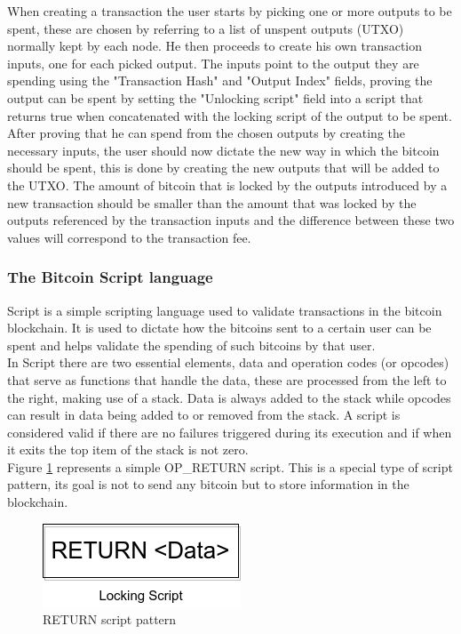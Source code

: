 When creating a transaction the user starts by picking one or more outputs to be spent, these are chosen by referring to a list of unspent outputs (UTXO) normally kept by each node. He then proceeds to create his own transaction inputs, one for each picked output. The inputs point to the output they are spending using the "Transaction Hash" and "Output Index" fields, proving the output can be spent by setting the "Unlocking script" field into a script that returns true when concatenated with the locking script of the output to be spent.
After proving that he can spend from the chosen outputs by creating the necessary inputs, the user should now dictate the new way in which the bitcoin should be spent, this is done by creating the new outputs that will be added to the UTXO. The amount of bitcoin that is locked by the outputs introduced by a new transaction should be smaller than the amount that was locked by the outputs referenced by the transaction inputs and the difference between these two values will correspond to the transaction fee.\\

\subsubsection{The Bitcoin Script language}
\label{sssec:bitcoin_script}

Script \cite{bitcoin_script} is a simple scripting language used to validate transactions in the bitcoin blockchain. It is used to dictate how the bitcoins sent to a certain user can be spent and helps validate the spending of such bitcoins by that user.\\
In Script there are two essential elements, data and operation codes (or opcodes) that serve as functions that handle the data, these are processed from the left to the right, making use of a stack. Data is always added to the stack while opcodes can result in data being added to or removed from the stack. A script is considered valid if there are no failures triggered during its execution and if when it exits the top item of the stack is not zero. \\
Figure \ref{fig:op_return} represents a simple OP\_RETURN script. This is a special type of script pattern, its goal is not to send any bitcoin but to store information in the blockchain.

\begin{figure}[H]
\begin{center}
  \includegraphics[width=0.3\linewidth]{images/op_return.png}
  \caption{RETURN script pattern}
  \label{fig:op_return}
  \end{center}
\end{figure}

